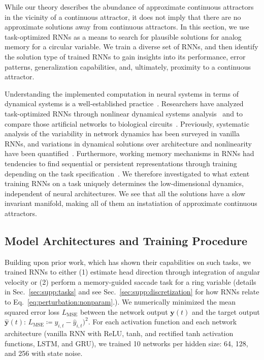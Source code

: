\documentclass{article} %
\newcounter{ct}
\theoremstyle{definition}
\theoremstyle{remark}
\begin{document}
While our theory describes the abundance of approximate continuous attractors in the vicinity of a continuous attractor, it does not imply that there are no approximate solutions away from continuous attractors.
In this section, we use task-optimized RNNs as a means to search for plausible solutions for analog memory for a circular variable.
We train a diverse set of RNNs, and then identify the solution type of trained RNNs to gain insights into its performance, error patterns, generalization capabilities, and, ultimately, proximity to a continuous attractor.

Understanding the implemented computation in neural systems in terms of dynamical systems is a well-established practice~\citep{seung1996,sompolinsky1988,vyas2020}.
Researchers have analyzed task-optimized RNNs through nonlinear dynamical systems analysis~\citep{sussillo2013blackbox,sussillo2014,barak2013,driscoll2022,maheswaranathan2019universality,cueva2019headdirection,cueva2021continuous} and to compare those artificial networks to biological circuits~\citep{mante2013context,remington2018flexible,ghazizadeh2021slow}.
Previously, systematic analysis of the variability in network dynamics has been surveyed in vanilla RNNs, and variations in dynamical solutions over architecture and nonlinearity have been quantified~\citep{sussillo2013blackbox,mante2013context,yang2019task,maheswaranathan2019universality,driscoll2022}.
Furthermore, working memory mechanisms in RNNs had tendencies to find sequential or persistent representations through training depending on the task specification~\citep{orhan2019diverse}.
We therefore investigated to what extent training RNNs on a task uniquely determines the low-dimensional dynamics, independent of neural architectures.
We see that all the solutions have a slow invariant manifold, making all of them an instatiation of approximate continuous attractors.

\subsection{Model Architectures and Training Procedure}
Building upon prior work, which has shown their capabilities on such tasks, we trained RNNs to either
(1) estimate head direction through integration of angular velocity \citep{cueva2019headdirection,cueva2021continuous}
or (2) perform a memory-guided saccade task for a ring variable \citep{wimmer2014,xie2022neural} (details in Sec.~\ref{sec:supp:tasks} and see Sec.~\ref{sec:supp:discretization} for how RNNs relate to Eq.~\ref{eq:perturbation:nonparam}.).
We numerically minimized the mean squared error loss \(L_{\operatorname{MSE}}\)  between the network output \(\mathbf{y}(t)\) and the target output \(\hat{\mathbf{y}}(t)\):
\(L_{\operatorname{MSE}} \coloneqq y_{i, t}-\hat y_{i, t})^{2}\).
For each activation function and each network architecture (vanilla RNN with ReLU, tanh, and rectified tanh activation functions, LSTM, and GRU), we trained 10 networks per hidden size: 64, 128, and 256 with state noise.
\end{document}
